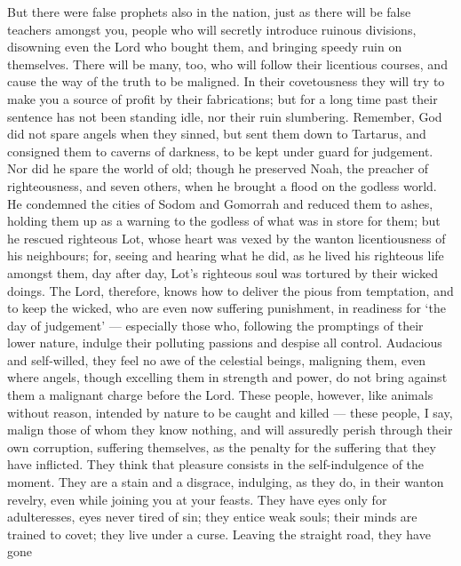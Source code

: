  But there were false prophets also in the nation, just as
there will be false teachers amongst you, people who will secretly
introduce ruinous divisions, disowning even the Lord who bought them,
and bringing speedy ruin on themselves.  There will be many,
too, who will follow their licentious courses, and cause the way of the
truth to be maligned.  In their covetousness they will try
to make you a source of profit by their fabrications; but for a long
time past their sentence has not been standing idle, nor their ruin
slumbering.  Remember, God did not spare angels when they
sinned, but sent them down to Tartarus, and consigned them to caverns of
darkness, to be kept under guard for judgement.  Nor did he
spare the world of old; though he preserved Noah, the preacher of
righteousness, and seven others, when he brought a flood on the godless
world.  He condemned the cities of Sodom and Gomorrah and
reduced them to ashes, holding them up as a warning to the godless of
what was in store for them;  but he rescued righteous Lot,
whose heart was vexed by the wanton licentiousness of his neighbours;
 for, seeing and hearing what he did, as he lived his
righteous life amongst them, day after day, Lot's righteous soul was
tortured by their wicked doings.  The Lord, therefore, knows
how to deliver the pious from temptation, and to keep the wicked, who
are even now suffering punishment, in readiness for `the day of
judgement' ---  especially those who, following the
promptings of their lower nature, indulge their polluting passions and
despise all control. Audacious and self-willed, they feel no awe of the
celestial beings, maligning them,  even where angels,
though excelling them in strength and power, do not bring against them a
malignant charge before the Lord.  These people, however,
like animals without reason, intended by nature to be caught and killed
--- these people, I say, malign those of whom they know nothing, and
will assuredly perish through their own corruption, 
suffering themselves, as the penalty for the suffering that they have
inflicted. They think that pleasure consists in the self-indulgence of
the moment. They are a stain and a disgrace, indulging, as they do, in
their wanton revelry, even while joining you at your feasts.
 They have eyes only for adulteresses, eyes never tired of
sin; they entice weak souls; their minds are trained to covet; they live
under a curse.  Leaving the straight road, they have gone
